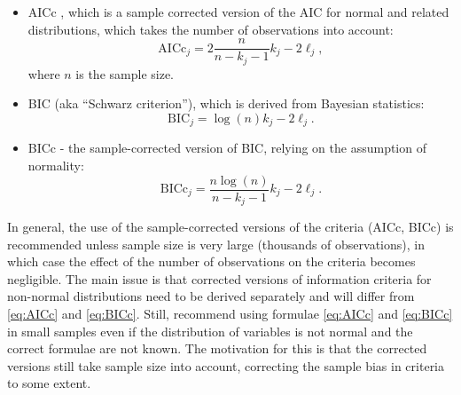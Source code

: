 \documentclass[
]{book}
\theoremstyle{definition}
\theoremstyle{definition}
\theoremstyle{definition}
\theoremstyle{definition}
\theoremstyle{remark}
\begin{document}
\begin{itemize}
\item
  AICc \citep{Sugiura1978}, which is a sample corrected version of the AIC for normal and related distributions, which takes the number of observations into account:
  \begin{equation}
    \mathrm{AICc}_j = 2 \frac{n}{n-k_j-1} k_j - 2 \ell_j
    \label{eq:AICc},
  \end{equation}
  where \(n\) is the sample size.
\item
  BIC \citep{Schwarz1978} (aka ``Schwarz criterion''), which is derived from Bayesian statistics:
  \begin{equation}
    \mathrm{BIC}_j = \log(n) k_j - 2 \ell_j
    \label{eq:BIC}.
  \end{equation}
\item
  BICc \citep{McQuarrie1999} - the sample-corrected version of BIC, relying on the assumption of normality:
  \begin{equation}
    \mathrm{BICc}_j = \frac{n \log (n)}{n-k_j-1} k_j - 2 \ell_j
    \label{eq:BICc}.
  \end{equation}
\end{itemize}

In general, the use of the sample-corrected versions of the criteria (AICc, BICc) is recommended unless sample size is very large (thousands of observations), in which case the effect of the number of observations on the criteria becomes negligible. The main issue is that corrected versions of information criteria for non-normal distributions need to be derived separately and will differ from \eqref{eq:AICc} and \eqref{eq:BICc}. Still, \citet{Burnham2004} recommend using formulae \eqref{eq:AICc} and \eqref{eq:BICc} in small samples even if the distribution of variables is not normal and the correct formulae are not known. The motivation for this is that the corrected versions still take sample size into account, correcting the sample bias in criteria to some extent.
\end{document}
